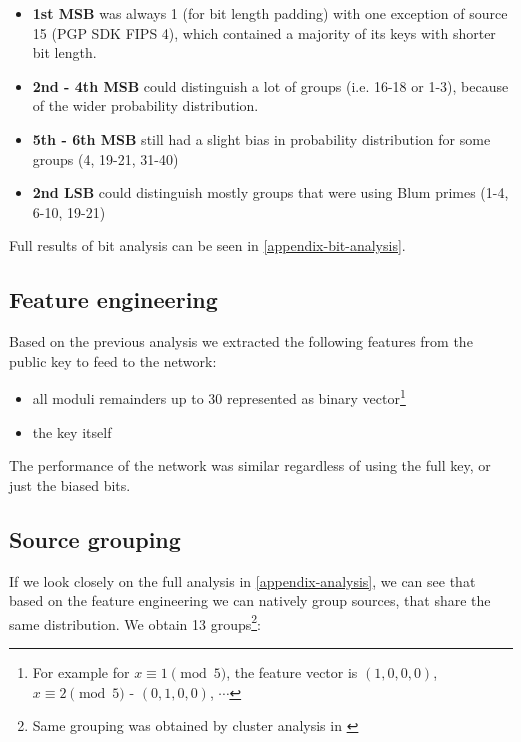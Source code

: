\begin{itemize}

\item \textbf{1st MSB} was always 1 (for bit length padding) with one exception of source 15 (PGP SDK FIPS 4), which contained a majority of its keys with shorter bit length.

\item \textbf{2nd - 4th MSB} could distinguish a lot of groups (i.e. 16-18 or 1-3), because of the wider probability distribution.

\item \textbf{5th - 6th MSB} still had a slight bias in probability distribution for some groups (4, 19-21, 31-40)

\item \textbf{2nd LSB} could distinguish mostly groups that were using Blum primes (1-4, 6-10, 19-21)

\end{itemize}

\noindent
Full results of bit analysis can be seen in \autoref{appendix-bit-analysis}.

\subsection{Feature engineering}

\label{feature-engineering}

Based on the previous analysis we extracted the following features from the public key to feed to the network:

\begin{itemize}

\item all moduli remainders up to 30 represented as binary vector\footnote{For example for $x \equiv 1 \pmod{5}$, the feature vector is $(1,0,0,0)$, $x \equiv 2 \pmod{5}$ - $(0,1,0,0)$, $\cdots$}

\item the key itself

\end{itemize}

\noindent
The performance of the network was similar regardless of using the full key, or just the biased bits.

\subsection{Source grouping}
If we look closely on the full analysis in \autoref{appendix-analysis}, we can see that based on the feature engineering we can natively group sources, that share the same distribution. We obtain 13 groups\footnote{Same grouping was obtained by cluster analysis in \cite{svenda_1}}:

